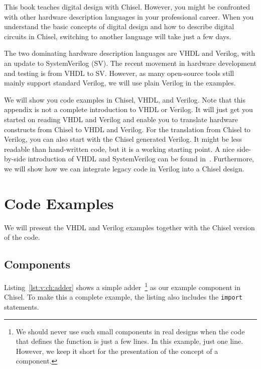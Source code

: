 \documentclass[%
    10pt,
    headinclude, footexclude,
    openright, %
    notitlepage,
    cleardoubleempty,
    headsepline,
    pointlessnumbers,
    bibtotoc, idxtotoc,
    ]{scrbook}
\newcommand{\code}[1]{{\lstinline[basicstyle=\small\ttfamily]{#1}}}
\begin{document}

This book teaches digital design with Chisel.
However, you might be confronted with other hardware
description languages in your professional career.
When you understand the basic concepts of digital design
and how to describe digital circuits in Chisel,
switching to another language will take just a few days.

The two dominating hardware description languages are
VHDL and Verilog, with an update to SystemVerilog (SV).
The recent movement in hardware development and testing is from VHDL to SV.
However, as many open-source tools still mainly support standard Verilog,
we will use plain Verilog in the examples.

We will show you code examples in Chisel, VHDL, and Verilog.
Note that this appendix is not a complete introduction to VHDL or Verilog.
It will just get you started on reading VHDL and Verilog and
enable you to translate hardware constructs from Chisel to VHDL and Verilog.
For the translation from Chisel to Verilog, you can also start with the Chisel
generated Verilog. It might be less readable than hand-written code, but it is a working
starting point.
A nice side-by-side introduction of VHDL and SystemVerilog can be found in~\cite{harris2021digital}.
Furthermore, we will show how we can integrate legacy code in Verilog into a Chisel design.

\section{Code Examples}


We will present the VHDL and Verilog examples together with the Chisel version
of the code.

\subsection{Components}



Listing~\ref{lst:v:ch:adder} shows a simple adder~\footnote{We should never use
such small components in real designs when the code that defines the function is just a few lines.
In this example, just one line. However, we keep it short for the presentation
of the concept of a component.}
as our example component in Chisel.
To make this a complete example, the listing also includes the \code{import} statements.
\end{document}
